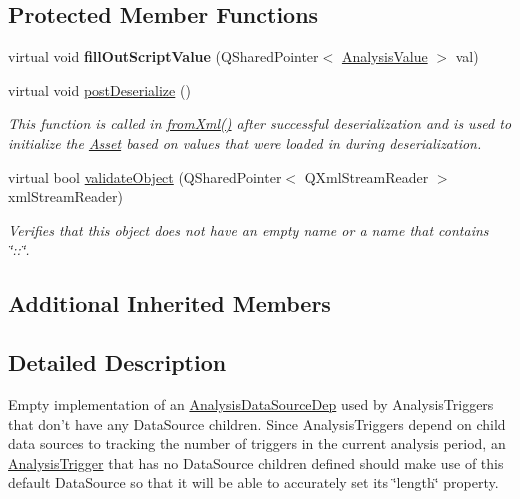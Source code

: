 \subsection*{Protected Member Functions}
\begin{DoxyCompactItemize}
\item 
\hypertarget{class_picto_1_1_default_data_source_a5efba2bcdcdf3b5907f69fe19cba635a}{virtual void {\bfseries fill\-Out\-Script\-Value} (Q\-Shared\-Pointer$<$ \hyperlink{struct_picto_1_1_analysis_value}{Analysis\-Value} $>$ val)}\label{class_picto_1_1_default_data_source_a5efba2bcdcdf3b5907f69fe19cba635a}

\item 
virtual void \hyperlink{class_picto_1_1_default_data_source_a834d1e2071c178afdaca4fca5a36ed81}{post\-Deserialize} ()
\begin{DoxyCompactList}\small\item\em This function is called in \hyperlink{class_picto_1_1_asset_a8bed4da09ecb1c07ce0dab313a9aba67}{from\-Xml()} after successful deserialization and is used to initialize the \hyperlink{class_picto_1_1_asset}{Asset} based on values that were loaded in during deserialization. \end{DoxyCompactList}\item 
\hypertarget{class_picto_1_1_default_data_source_af90179d2a1f124a81b0728bbf4897700}{virtual bool \hyperlink{class_picto_1_1_default_data_source_af90179d2a1f124a81b0728bbf4897700}{validate\-Object} (Q\-Shared\-Pointer$<$ Q\-Xml\-Stream\-Reader $>$ xml\-Stream\-Reader)}\label{class_picto_1_1_default_data_source_af90179d2a1f124a81b0728bbf4897700}

\begin{DoxyCompactList}\small\item\em Verifies that this object does not have an empty name or a name that contains \char`\"{}\-::\char`\"{}. \end{DoxyCompactList}\end{DoxyCompactItemize}
\subsection*{Additional Inherited Members}


\subsection{Detailed Description}
Empty implementation of an \hyperlink{class_picto_1_1_analysis_data_source_dep}{Analysis\-Data\-Source\-Dep} used by Analysis\-Triggers that don't have any Data\-Source children. Since Analysis\-Triggers depend on child data sources to tracking the number of triggers in the current analysis period, an \hyperlink{class_picto_1_1_analysis_trigger}{Analysis\-Trigger} that has no Data\-Source children defined should make use of this default Data\-Source so that it will be able to accurately set its \char`\"{}length\char`\"{} property. 

